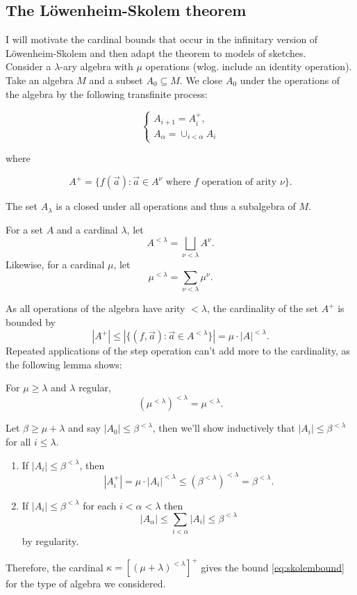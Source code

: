 \subsection{The Löwenheim-Skolem theorem}

I will motivate the cardinal bounds that occur in the infinitary version of Löwenheim-Skolem and then adapt the theorem to models of sketches. \\

Consider a $\lambda$-ary algebra with $\mu$ operations (wlog. include an identity operation). Take an algebra $M$ and a subset $A_0 \subseteq M$. We close $A_0$ under the operations of the algebra by the following transfinite process:

\[
\begin{cases}
A_{i+1} = A_i^+, \\
A_{\alpha} = \cup_{i < \alpha} A_i
\end{cases}
\]

where

\[ A^+ = \{ f(\vec a) : \vec a \in A^\nu \text{ where } f \text{ operation of arity } \nu \}. \] 

The set $A_\lambda$ is a closed under all operations and thus a subalgebra of $M$. 

\begin{Definition}
For a set $A$ and a cardinal $\lambda$, let
\[ A^{< \lambda} = \bigsqcup_{\nu < \lambda} A^\nu. \]
Likewise, for a cardinal $\mu$, let
\[ \mu^{< \lambda} = \sum_{\nu < \lambda} \mu^\nu. \]
\end{Definition}

As all operations of the algebra have arity $< \lambda$, the cardinality of the set $A^+$ is bounded by
\[ |A^+| \leq |\{ (f,\vec a) : \vec a \in A^{< \lambda} \}| = \mu \cdot |A|^{< \lambda}. \]
Repeated applications of the step operation can't add more to the cardinality, as the following lemma shows:

\begin{Lemma}
For $\mu \geq \lambda$ and $\lambda$ regular, 
\[ \left(\mu^{< \lambda}\right)^{< \lambda} = \mu^{< \lambda}. \]
\end{Lemma}

Let $\beta \geq \mu + \lambda$ and say $|A_0| \leq \beta^{< \lambda}$, then we'll show inductively that $|A_i| \leq \beta^{< \lambda}$ for all $i \leq \lambda$.
\begin{enumerate}
\item If $|A_i| \leq \beta^{< \lambda}$, then
\[ |A_i^+| = \mu \cdot |A_i|^{< \lambda} \leq \left(\beta^{< \lambda}\right)^{< \lambda} = \beta^{< \lambda}. \]
\item If $|A_i| \leq \beta^{< \lambda}$ for each $i < \alpha < \lambda$ then
\[ |A_\alpha| \leq \sum_{i < \alpha} |A_i| \leq \beta^{< \lambda} \]
by regularity.
\end{enumerate}
Therefore, the cardinal $\kappa = \left[(\mu + \lambda)^{<\lambda}\right]^+$ gives the bound \eqref{eq:skolembound} for the type of algebra we considered.